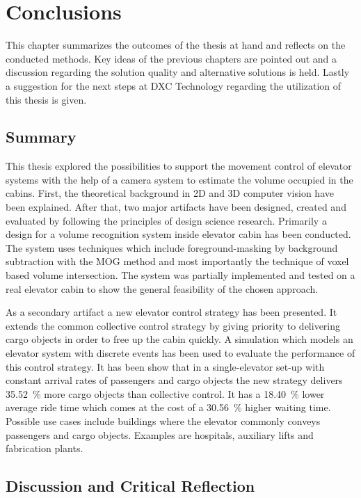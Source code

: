 \chapter{Conclusions}
\label{chap:concl}

This chapter summarizes the outcomes of the thesis at hand 
and reflects on the conducted methods.
Key ideas of the previous chapters are pointed out and a discussion regarding the solution quality and alternative solutions is held.
Lastly a suggestion for the next steps at DXC Technology regarding the utilization of this thesis is given.

\section{Summary}

This thesis explored the possibilities to support the movement control of elevator systems with the help of a camera system to estimate the volume occupied in the cabins.
First, the theoretical background in \ac{2D} and \ac{3D} computer vision have been explained.
After that, two major artifacts have been designed, created and evaluated by following the principles of design science research.
Primarily a design for a volume recognition system inside elevator cabin has been conducted.
The system uses techniques which include foreground-masking by background subtraction with the \ac{MOG} method and most importantly the technique of voxel based volume intersection.
The system was partially implemented and tested on a real elevator cabin to show the general feasibility of the chosen approach.

As a secondary artifact a new elevator control strategy has been presented.
It extends the common collective control strategy by giving priority to delivering cargo objects in order to free up the cabin quickly.
A simulation which models an elevator system with discrete events has been used to evaluate the performance of this control strategy.
It has been show that in a single-elevator set-up with constant arrival rates of passengers and cargo objects the new strategy delivers 35.52~\% more cargo objects than collective control.
It has a 18.40~\% lower average ride time which comes at the cost of a 30.56~\% higher waiting time.
Possible use cases include buildings where the elevator commonly conveys passengers and cargo objects.
Examples are hospitals, auxiliary lifts and fabrication plants.

\section{Discussion and Critical Reflection}

